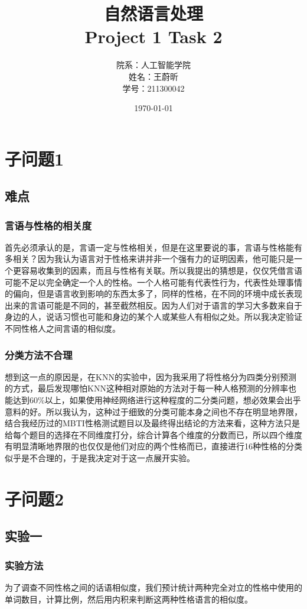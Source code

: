 \documentclass{article}
\title{\huge  自然语言处理\\ \large Project 1 Task 2}
\author{院系：人工智能学院\\姓名：王蔚昕\\学号：211300042}
\date{\today}
\begin{document}
	\maketitle
	\newpage
	\tableofcontents
	\newpage
	\section{子问题1}
	\subsection{难点}
	\subsubsection{言语与性格的相关度}
	首先必须承认的是，言语一定与性格相关，但是在这里要说的事，言语与性格能有多相关？因为我认为语言对于性格来讲并非一个强有力的证明因素，他可能只是一个更容易收集到的因素，而且与性格有关联。所以我提出的猜想是，仅仅凭借言语可能不足以完全确定一个人的性格。一个人格可能有代表性行为，代表性处理事情的偏向，但是语言收到影响的东西太多了，同样的性格，在不同的环境中成长表现出来的言语可能是不同的，甚至截然相反。因为人们对于语言的学习大多数来自于身边的人，说话习惯也可能和身边的某个人或某些人有相似之处。所以我决定验证不同性格人之间言语的相似度。
	\subsubsection{分类方法不合理}
	想到这一点的原因是，在KNN的实验中，因为我采用了将性格分为四类分别预测的方式，最后发现哪怕KNN这种相对原始的方法对于每一种人格预测的分辨率也能达到60\%以上，如果使用神经网络进行这种程度的二分类问题，想必效果会出乎意料的好。所以我认为，这种过于细致的分类可能本身之间也不存在明显地界限，结合我经历过的MBTI性格测试题目以及最终得出结论的方法来看，这种方法只是给每个题目的选择在不同维度打分，综合计算各个维度的分数而已，所以四个维度有明显清晰地界限的也仅仅是他们对应的两个性格而已，直接进行16种性格的分类似乎是不合理的，于是我决定对于这一点展开实验。
	\section{子问题2}
	\subsection{实验一}
	\subsubsection{实验方法}
	为了调查不同性格之间的话语相似度，我们预计统计两种完全对立的性格中使用的单词数目，计算比例，然后用内积来判断这两种性格语言的相似度。
\end{document}
